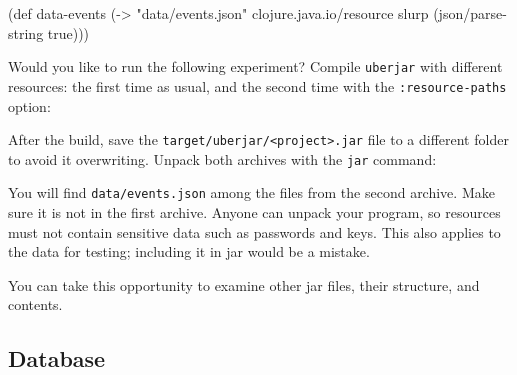 \begin{english}
  \begin{clojure}
(def data-events
  (-> "data/events.json"
      clojure.java.io/resource
      slurp
      (json/parse-string true)))
  \end{clojure}
\end{english}

Would you like to run the following experiment? Compile \verb|uberjar| with different resources: the first time as usual, and the second time with the \verb|:resource-paths| option:

\ifx\DEVICETYPE\MOBILE

\begin{english}
  \begin{clojure}
:profiles
  {:uberjar {:resource-paths
             ["env/test/resources"]}
  \end{clojure}
\end{english}

\else

\begin{english}
  \begin{clojure}
:profiles {:uberjar {:resource-paths ["env/test/resources"]}
  \end{clojure}
\end{english}

\fi

After the build, save the \texttt{target/uber\-jar/<project>.jar} file to a different folder to avoid it overwriting. Unpack both archives with the \verb|jar| command:

\begin{english}
\end{english}

You will find \verb|data/events.json| among the files from the second archive. Make sure it is not in the first archive. Anyone can unpack your program, so resources must not contain sensitive data such as passwords and keys. This also applies to the data for testing; including it in jar would be a mistake.

You can take this opportunity to examine other jar files, their structure, and contents.

\subsection{Database}

